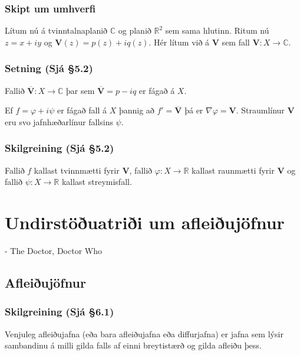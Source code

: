 \documentclass[a4paper,10pt,icelandic]{sphinxmanual}
\begin{document}
\subsection{Skipt um umhverfi}
\label{\detokenize{Kafli05:skipt-um-umhverfi}}
Lítum nú á tvinntalnaplanið \({\mathbb{C}}\) og planið \({\mathbb{R}}^2\) sem sama hlutinn. Ritum nú \(z=x+iy\) og \({\mathbf V}(z)=p(z)+iq(z)\). Hér lítum við á \({\mathbf V}\) sem fall \({\mathbf V}:X\to {\mathbb{C}}\).


\subsection{Setning (Sjá \S{}5.2)}
\label{\detokenize{Kafli05:setning-sja-5-2}}
Fallið \(\overline{\mathbf V}:X\to {\mathbb{C}}\) þar sem \(\overline{\mathbf V}=p-iq\) er fágað á \(X\).

Ef \(f=\varphi+i\psi\) er fágað fall á \(X\) þannig að \(f'=\overline{\mathbf V}\) þá er \(\nabla \varphi={\mathbf V}\). Straumlínur \({\mathbf V}\) eru svo jafnhæðarlínur fallsins \(\psi\).


\subsection{Skilgreining (Sjá \S{}5.2)}
\label{\detokenize{Kafli05:skilgreining-sja-5-2}}
Fallið \(f\) kallast tvinnmætti fyrir \({\mathbf V}\), fallið \(\varphi:X\to {\mathbb{R}}\) kallast raunmætti fyrir \({\mathbf V}\) og fallið \(\psi:X\to {\mathbb{R}}\) kallast streymisfall.


\chapter{Undirstöðuatriði um afleiðujöfnur}
\label{\detokenize{Kafli06:undirstouatrii-um-afleiujofnur}}\label{\detokenize{Kafli06::doc}}

- The Doctor, Doctor Who


\section{Afleiðujöfnur}
\label{\detokenize{Kafli06:afleiujofnur}}

\subsection{Skilgreining (Sjá \S{}6.1)}
\label{\detokenize{Kafli06:skilgreining-sja-6-1}}
Venjuleg afleiðujafna (eða bara afleiðujafna eða diffurjafna) er jafna sem lýsir sambandinu á milli gilda falls af einni breytistærð og gilda afleiðu þess.
\end{document}
